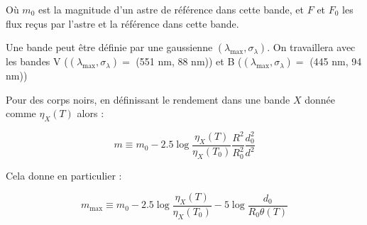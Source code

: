\documentclass[11pt]{article} %
\begin{document}
Où $m_0$ est la magnitude d'un astre de référence dans cette bande, et $F$ et $F_0$ les flux reçus par l'astre et la référence dans cette bande.

Une bande peut être définie par une gaussienne $(\lambda_{\mbox{max}},\sigma_\lambda)$. On travaillera avec les bandes V ($(\lambda_{\mbox{max}},\sigma_\lambda) = $ (551 nm, 88 nm)) et B ($(\lambda_{\mbox{max}},\sigma_\lambda) = $ (445 nm, 94 nm))

Pour des corps noirs, en définissant le rendement dans une bande $X$ donnée comme $\eta_X(T)$ alors :

\begin{equation}
m \equiv m_0 - 2.5 \log \dfrac{\eta_X(T)}{\eta_X(T_0)} \dfrac{R^2}{R_0^2} \dfrac{d_0^2}{d^2}
\end{equation}

Cela donne en particulier :

\begin{equation}
m_{\mbox{max}} \equiv m_0 - 2.5 \log \dfrac{\eta_X(T)}{\eta_X(T_0)} - 5 \log {\dfrac{d_0}{R_0 \theta(T)}}
\end{equation}

%
%
\end{document}
